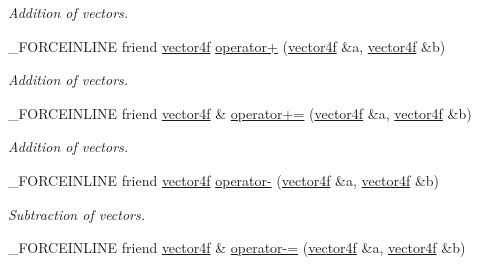 \begin{DoxyCompactItemize}
\begin{DoxyCompactList}\small\item\em Addition of vectors. \end{DoxyCompactList}\item 
\hypertarget{classbt_1_1vector4f_a928ae03b1925430296229f9c594e1883}{\-\_\-\-F\-O\-R\-C\-E\-I\-N\-L\-I\-N\-E friend \hyperlink{classbt_1_1vector4f}{vector4f} \hyperlink{classbt_1_1vector4f_a928ae03b1925430296229f9c594e1883}{operator+} (\hyperlink{classbt_1_1vector4f}{vector4f} \&a, \hyperlink{classbt_1_1vector4f}{vector4f} \&b)}\label{classbt_1_1vector4f_a928ae03b1925430296229f9c594e1883}

\begin{DoxyCompactList}\small\item\em Addition of vectors. \end{DoxyCompactList}\item 
\hypertarget{classbt_1_1vector4f_aa1c931d21cecf64ebf33a37ae8d1f07e}{\-\_\-\-F\-O\-R\-C\-E\-I\-N\-L\-I\-N\-E friend \hyperlink{classbt_1_1vector4f}{vector4f} \& \hyperlink{classbt_1_1vector4f_aa1c931d21cecf64ebf33a37ae8d1f07e}{operator+=} (\hyperlink{classbt_1_1vector4f}{vector4f} \&a, \hyperlink{classbt_1_1vector4f}{vector4f} \&b)}\label{classbt_1_1vector4f_aa1c931d21cecf64ebf33a37ae8d1f07e}

\begin{DoxyCompactList}\small\item\em Addition of vectors. \end{DoxyCompactList}\item 
\hypertarget{classbt_1_1vector4f_aa88d1c29ac401ad15dd25b4f7bfdaacf}{\-\_\-\-F\-O\-R\-C\-E\-I\-N\-L\-I\-N\-E friend \hyperlink{classbt_1_1vector4f}{vector4f} \hyperlink{classbt_1_1vector4f_aa88d1c29ac401ad15dd25b4f7bfdaacf}{operator-\/} (\hyperlink{classbt_1_1vector4f}{vector4f} \&a, \hyperlink{classbt_1_1vector4f}{vector4f} \&b)}\label{classbt_1_1vector4f_aa88d1c29ac401ad15dd25b4f7bfdaacf}

\begin{DoxyCompactList}\small\item\em Subtraction of vectors. \end{DoxyCompactList}\item 
\hypertarget{classbt_1_1vector4f_a7b1d6c5b0a13564ff703be45afa0733c}{\-\_\-\-F\-O\-R\-C\-E\-I\-N\-L\-I\-N\-E friend \hyperlink{classbt_1_1vector4f}{vector4f} \& \hyperlink{classbt_1_1vector4f_a7b1d6c5b0a13564ff703be45afa0733c}{operator-\/=} (\hyperlink{classbt_1_1vector4f}{vector4f} \&a, \hyperlink{classbt_1_1vector4f}{vector4f} \&b)}\label{classbt_1_1vector4f_a7b1d6c5b0a13564ff703be45afa0733c}


\end{DoxyCompactItemize}
